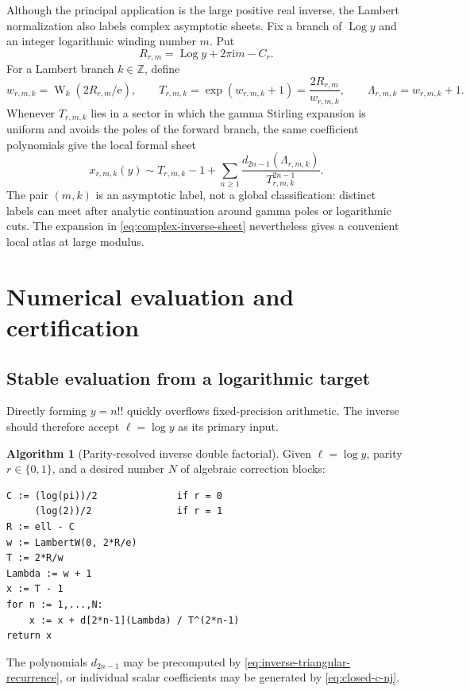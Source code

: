 \documentclass[11pt,a4paper,oneside]{article}
\theoremstyle{plain}
\theoremstyle{definition}
\newtheorem{algorithm}[theorem]{Algorithm}
\theoremstyle{remark}
\newcommand{\e}{\mathrm e}
\newcommand{\ii}{\mathrm i}
\newcommand{\W}{\operatorname W}
\newcommand{\Log}{\operatorname{Log}}
\begin{document}
Although the principal application is the large positive real inverse, the
Lambert normalization also labels complex asymptotic sheets.  Fix a branch of
$\Log y$ and an integer logarithmic winding number $m$.  Put
\begin{equation}
 R_{r,m}=\Log y+2\pi\ii m-C_r.
 \label{eq:complex-R}
\end{equation}
For a Lambert branch $k\in\mathbb Z$, define
\begin{equation}
 w_{r,m,k}=\W_k(2R_{r,m}/\e),
 \qquad
 T_{r,m,k}=\exp(w_{r,m,k}+1)=\frac{2R_{r,m}}{w_{r,m,k}},
 \qquad
 \Lambda_{r,m,k}=w_{r,m,k}+1.
 \label{eq:complex-core}
\end{equation}
Whenever $T_{r,m,k}$ lies in a sector in which the gamma Stirling expansion is
uniform and avoids the poles of the forward branch, the same coefficient
polynomials give the local formal sheet
\begin{equation}
 x_{r,m,k}(y)
 \sim T_{r,m,k}-1+
 \sum_{n\ge1}\frac{d_{2n-1}(\Lambda_{r,m,k})}
 {T_{r,m,k}^{2n-1}}.
 \label{eq:complex-inverse-sheet}
\end{equation}
The pair $(m,k)$ is an asymptotic label, not a global classification: distinct
labels can meet after analytic continuation around gamma poles or logarithmic
cuts.  The expansion in \cref{eq:complex-inverse-sheet} nevertheless gives a convenient
local atlas at large modulus.

\section{Numerical evaluation and certification}
\label{sec:algorithm}

\subsection{Stable evaluation from a logarithmic target}

Directly forming $y=n!!$ quickly overflows fixed-precision arithmetic.  The
inverse should therefore accept $\ell=\log y$ as its primary input.

\begin{algorithm}[Parity-resolved inverse double factorial]
\label{alg:inverse-double-factorial}
Given $\ell=\log y$, parity $r\in\{0,1\}$, and a desired number $N$ of
algebraic correction blocks:
\begin{lstlisting}
C := (log(pi))/2              if r = 0
     (log(2))/2               if r = 1
R := ell - C
w := LambertW(0, 2*R/e)
T := 2*R/w
Lambda := w + 1
x := T - 1
for n := 1,...,N:
    x := x + d[2*n-1](Lambda) / T^(2*n-1)
return x
\end{lstlisting}
The polynomials $d_{2n-1}$ may be precomputed by
\cref{eq:inverse-triangular-recurrence}, or individual scalar coefficients may
be generated by \cref{eq:closed-c-nj}.
\end{algorithm}
\end{document}

